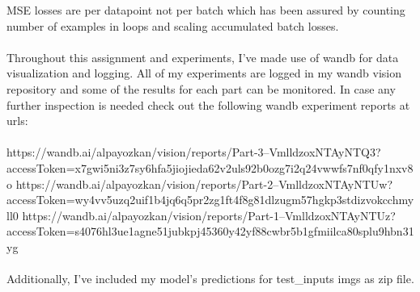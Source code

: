 \documentclass[12pt]{article}
\begin{document}
MSE losses are per datapoint not per batch which has been assured by counting number of examples in loops and scaling accumulated batch losses. 
\\~\\
Throughout this assignment and experiments, I've made use of wandb for data visualization and logging.
All of my experiments are logged in my wandb vision repository and some of the results for each part can be monitored. In case any further inspection is needed check out the following wandb experiment reports at urls:
\\~\\
https://wandb.ai/alpayozkan/vision/reports/Part-3--VmlldzoxNTAyNTQ3?accessToken=x7gwi5ni3z7sy6hfa5jiojieda62v2uls92b0ozg7i2q24vwwfs7nf0qfy1nxv8o
https://wandb.ai/alpayozkan/vision/reports/Part-2--VmlldzoxNTAyNTUw?accessToken=wy4vv5uzq2uif1b4jq6q5pr2zg1ft4f8g81dlzugm57hgkp3stdizvokcchmyll0
https://wandb.ai/alpayozkan/vision/reports/Part-1--VmlldzoxNTAyNTUz?accessToken=s4076hl3ue1agne51jubkpj45360y42yf88cwbr5b1gfmiilca80splu9hbn31yg
\\~\\
Additionally, I've included my model's predictions for test\_inputs imgs as zip file.
\end{document}
